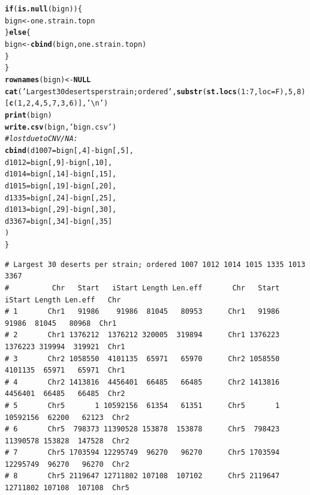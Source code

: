 \documentclass{article}\usepackage[]{graphicx}\usepackage[]{color}
\makeatletter
\newcommand{\hlnum}[1]{\textcolor[rgb]{0.686,0.059,0.569}{#1}}%
\newcommand{\hlstr}[1]{\textcolor[rgb]{0.192,0.494,0.8}{#1}}%
\newcommand{\hlcom}[1]{\textcolor[rgb]{0.678,0.584,0.686}{\textit{#1}}}%
\newcommand{\hlopt}[1]{\textcolor[rgb]{0,0,0}{#1}}%
\newcommand{\hlstd}[1]{\textcolor[rgb]{0.345,0.345,0.345}{#1}}%
\newcommand{\hlkwa}[1]{\textcolor[rgb]{0.161,0.373,0.58}{\textbf{#1}}}%
\newcommand{\hlkwb}[1]{\textcolor[rgb]{0.69,0.353,0.396}{#1}}%
\newcommand{\hlkwc}[1]{\textcolor[rgb]{0.333,0.667,0.333}{#1}}%
\newcommand{\hlkwd}[1]{\textcolor[rgb]{0.737,0.353,0.396}{\textbf{#1}}}%
\newenvironment{kframe}{%
 \def\at@end@of@kframe{}%
 \ifinner\ifhmode%
  \def\at@end@of@kframe{\end{minipage}}%
  \begin{minipage}{\columnwidth}%
 \fi\fi%
 \def\FrameCommand##1{\hskip\@totalleftmargin \hskip-\fboxsep
 \colorbox{shadecolor}{##1}\hskip-\fboxsep
     \hskip-\linewidth \hskip-\@totalleftmargin \hskip\columnwidth}%
 \MakeFramed {\advance\hsize-\width
   \@totalleftmargin\z@ \linewidth\hsize
   \@setminipage}}%
 {\par\unskip\endMakeFramed%
 \at@end@of@kframe}
\newenvironment{knitrout}{}{} %
\makeatother
\begin{document}
\begin{knitrout}
\begin{kframe}
\begin{alltt}
    \hlkwa{if}\hlstd{(}\hlkwd{is.null}\hlstd{(bign))\{}
      \hlstd{bign} \hlkwb{<-} \hlstd{one.strain.topn}
    \hlstd{\}} \hlkwa{else} \hlstd{\{}
      \hlstd{bign} \hlkwb{<-} \hlkwd{cbind}\hlstd{(bign, one.strain.topn)}
    \hlstd{\}}
  \hlstd{\}}
  \hlkwd{rownames}\hlstd{(bign)} \hlkwb{<-} \hlkwa{NULL}
  \hlkwd{cat}\hlstd{(}\hlstr{'Largest 30 deserts per strain; ordered'}\hlstd{,} \hlkwd{substr}\hlstd{(}\hlkwd{st.locs}\hlstd{(}\hlnum{1}\hlopt{:}\hlnum{7}\hlstd{,}\hlkwc{loc}\hlstd{=F),} \hlnum{5}\hlstd{,}\hlnum{8}\hlstd{)[}\hlkwd{c}\hlstd{(}\hlnum{1}\hlstd{,}\hlnum{2}\hlstd{,}\hlnum{4}\hlstd{,}\hlnum{5}\hlstd{,}\hlnum{7}\hlstd{,}\hlnum{3}\hlstd{,}\hlnum{6}\hlstd{)],} \hlstr{'\textbackslash{}n'}\hlstd{)}
  \hlkwd{print}\hlstd{(bign)}
  \hlkwd{write.csv}\hlstd{(bign,}\hlstr{'bign.csv'}\hlstd{)}
  \hlcom{# lost due to CNV/NA:}
  \hlkwd{cbind}\hlstd{(} \hlkwc{d1007}\hlstd{=bign[,}\hlnum{4}\hlstd{]}\hlopt{-}\hlstd{bign[,}\hlnum{5}\hlstd{],}
         \hlkwc{d1012}\hlstd{=bign[,}\hlnum{9}\hlstd{]}\hlopt{-}\hlstd{bign[,}\hlnum{10}\hlstd{],}
         \hlkwc{d1014}\hlstd{=bign[,}\hlnum{14}\hlstd{]}\hlopt{-}\hlstd{bign[,}\hlnum{15}\hlstd{],}
         \hlkwc{d1015}\hlstd{=bign[,}\hlnum{19}\hlstd{]}\hlopt{-}\hlstd{bign[,}\hlnum{20}\hlstd{],}
         \hlkwc{d1335}\hlstd{=bign[,}\hlnum{24}\hlstd{]}\hlopt{-}\hlstd{bign[,}\hlnum{25}\hlstd{],}
         \hlkwc{d1013}\hlstd{=bign[,}\hlnum{29}\hlstd{]}\hlopt{-}\hlstd{bign[,}\hlnum{30}\hlstd{],}
         \hlkwc{d3367}\hlstd{=bign[,}\hlnum{34}\hlstd{]}\hlopt{-}\hlstd{bign[,}\hlnum{35}\hlstd{]}
  \hlstd{)}
\hlstd{\}}
\end{alltt}
\begin{verbatim}
# Largest 30 deserts per strain; ordered 1007 1012 1014 1015 1335 1013 3367 
#          Chr   Start   iStart Length Len.eff       Chr   Start   iStart Length Len.eff   Chr
# 1       Chr1   91986    91986  81045   80953      Chr1   91986    91986  81045   80968  Chr1
# 2       Chr1 1376212  1376212 320005  319894      Chr1 1376223  1376223 319994  319921  Chr1
# 3       Chr2 1058550  4101135  65971   65970      Chr2 1058550  4101135  65971   65971  Chr1
# 4       Chr2 1413816  4456401  66485   66485      Chr2 1413816  4456401  66485   66485  Chr2
# 5       Chr5       1 10592156  61354   61351      Chr5       1 10592156  62200   62123  Chr2
# 6       Chr5  798373 11390528 153878  153878      Chr5  798423 11390578 153828  147528  Chr2
# 7       Chr5 1703594 12295749  96270   96270      Chr5 1703594 12295749  96270   96270  Chr2
# 8       Chr5 2119647 12711802 107108  107102      Chr5 2119647 12711802 107108  107108  Chr5

\end{verbatim}
\end{kframe}
\end{knitrout}
\end{document}
